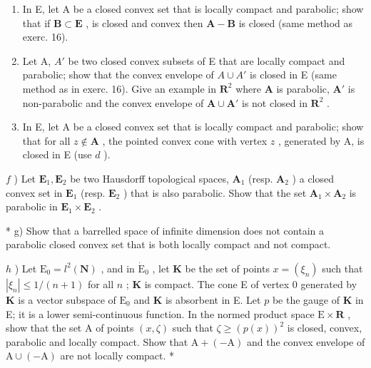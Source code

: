 \begin{enumerate}
\def\labelenumi{\alph{enumi})}
\setcounter{enumi}{2}
\item
  In E, let A be a closed convex set that is locally compact and parabolic; show that if \(\mathbf{B} \subset \mathbf{E}\) , is closed and convex then \(\mathbf{A} - \mathbf{B}\) is closed (same method as exerc. 16).
\item
  Let A, \(A'\) be two closed convex subsets of E that are locally compact and parabolic; show that the convex envelope of \(A \cup A'\) is closed in E (same method as in exerc. 16). Give an example in \(\mathbf{R}^2\) where \(\mathbf{A}\) is parabolic, \(\mathbf{A}'\) is non-parabolic and the convex envelope of \(\mathbf{A} \cup \mathbf{A}'\) is not closed in \(\mathbf{R}^2\) .
\item
  In E, let A be a closed convex set that is locally compact and parabolic; show that for all \(z \notin \mathbf{A}\) , the pointed convex cone with vertex \(z\) , generated by A, is closed in E (use \(d\) ).
\end{enumerate}

\(f\) ) Let \(\mathbf{E}_1, \mathbf{E}_2\) be two Hausdorff topological spaces, \(\mathbf{A}_1\) (resp. \(\mathbf{A}_2\) ) a closed convex set in \(\mathbf{E}_1\) (resp. \(\mathbf{E}_2\) ) that is also parabolic. Show that the set \(\mathbf{A}_1 \times \mathbf{A}_2\) is parabolic in \(\mathbf{E}_1 \times \mathbf{E}_2\) .

* g) Show that a barrelled space of infinite dimension does not contain a parabolic closed convex set that is both locally compact and not compact.

\(h\) ) Let \(\mathrm{E}_0 = l^2 (\mathbf{N})\) , and in \(\dot{\mathrm{E}}_0\) , let \(\mathbf{K}\) be the set of points \(x = (\xi_n)\) such that \(|\xi_n| \leqslant 1 / (n + 1)\) for all \(n\) ; \(\mathbf{K}\) is compact. The cone E of vertex 0 generated by \(\mathbf{K}\) is a vector subspace of \(\mathrm{E}_0\) and \(\mathbf{K}\) is absorbent in E. Let \(p\) be the gauge of \(\mathbf{K}\) in E; it is a lower semi-continuous function. In the normed product space \(\mathrm{E} \times \mathbf{R}\) , show that the set A of points \((x, \zeta)\) such that \(\zeta \geqslant (p(x))^2\) is closed, convex, parabolic and locally compact. Show that \(\mathrm{A} + (-\mathrm{A})\) and the convex envelope of \(\mathrm{A} \cup (-\mathrm{A})\) are not locally compact. *

